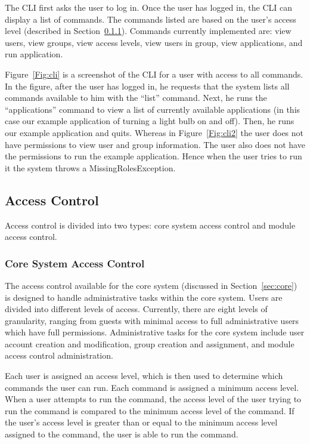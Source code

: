 The CLI first asks the user to log in. Once the user has logged in, the CLI can
display a list of commands. The commands listed are based on the user's access
level (described in Section~\ref{sec:core_access}). Commands currently
implemented are: view users, view groups, view access levels, view users in
group, view applications, and run application.

Figure~\ref{Fig:cli} is a screenshot of the CLI for a user with access to all
commands. In the figure, after the user has logged in, he requests that the
system lists all commands available to him with the ``list'' command. Next, he
runs the ``applications'' command to view a list of currently available
applications (in this case our example application of turning a light bulb on
and off). Then, he runs our example application and quits. Whereas in
Figure~\ref{Fig:cli2} the user does not have permissions to view user and group
information. The user also does not have the permissions to run the example
application. Hence when the user tries to run it the system throws a
MissingRolesException.
\subsection{Access Control}
\label{sec:access}
Access control is divided into two types: core system access control and module
access control.
\subsubsection{Core System Access Control}
\label{sec:core_access}
The access control available for the core system (discussed in
Section~\ref{sec:core}) is designed to handle administrative tasks within the
core system. Users are divided into different levels of access. Currently, there
are eight levels of granularity, ranging from guests with minimal access to
full administrative users which have full permissions. Administrative tasks for
the core system include user account creation and modification, group creation
and assignment, and module access control administration.

Each user is assigned an access level, which is then used to determine which
commands the user can run. Each command is assigned a minimum access level.
When a user attempts to run the command, the access level of the user trying to
run the command is compared to the minimum access level of the command. If the
user's access level is greater than or equal to the minimum access level
assigned to the command, the user is able to run the command.
